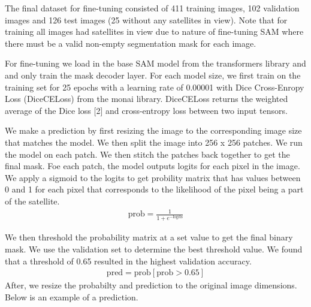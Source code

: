 \documentclass{article}
\begin{document}
The final dataset for fine-tuning consisted of 411 training images, 102 validation images and 126 test images (25 without any satellites in view). Note that for training all images had satellites in view due to nature of fine-tuning SAM where there must be a valid non-empty segmentation mask for each image. 

For fine-tuning we load in the base SAM model from the transformers library and and only train the mask decoder layer. For each model size, we first train on the training set for 25 epochs with a learning rate of 0.00001 with Dice Cross-Enropy Loss (DiceCELoss) from the monai library. DiceCELoss returns the weighted average of the Dice loss [2] and cross-entropy loss between two input tensors. 

We make a prediction by first resizing the image to the corresponding image size that matches the model. We then split the image into 256 x 256 patches. We run the model on each patch. We then stitch the patches back together to get the final mask. Foe each patch, the model outputs logits for each pixel in the image. We apply a sigmoid to the logits to get probility matrix that has values between 0 and 1 for each pixel that corresponds to the likelihood of the pixel being a part of the satellite. 
\begin{align}
    \text{prob} = \frac{1}{1 + e^{-\text{logits}}}
\end{align}

We then threshold the probability matrix at a set value to get the final binary mask. We use the validation set to determine the best threshold value. We found that a threshold of 0.65 resulted in the highest validation accuracy. 
\begin{align}
    \text{pred} = \text{prob}[\text{prob} > 0.65]
\end{align}
After, we resize the probabilty and prediction to the original image dimensions. Below is an example of a prediction.
\end{document}
